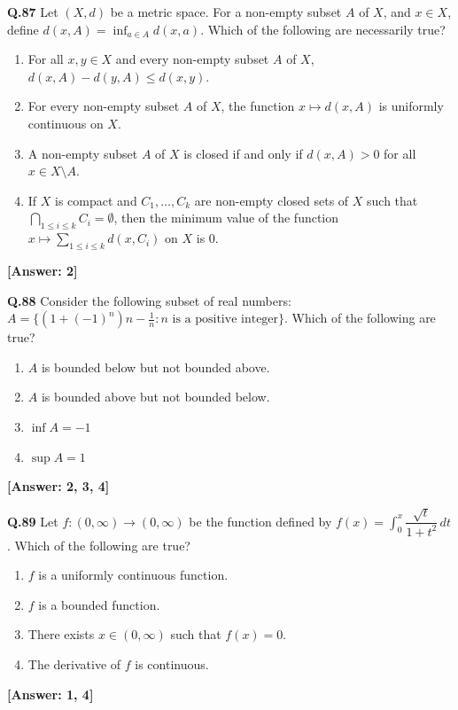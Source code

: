 \documentclass[12pt,a4paper]{article}
\newcommand{\ans}[1]{\quad\textcolor{anscolor}{\textbf{[Answer: #1]}}}
\begin{document}
\textbf{Q.87} Let $(X,d)$ be a metric space. For a non-empty subset $A$ of $X$, and $x\in X$, define $d(x,A)=\inf_{a\in A}d(x,a)$. Which of the following are necessarily true?
\begin{enumerate}[label=\arabic*.]
\item For all $x,y\in X$ and every non-empty subset $A$ of $X$, $d(x,A)-d(y,A)\le d(x,y)$.
\item For every non-empty subset $A$ of $X$, the function $x\mapsto d(x,A)$ is uniformly continuous on $X$.
\item A non-empty subset $A$ of $X$ is closed if and only if $d(x,A)>0$ for all $x\in X\setminus A$.
\item If $X$ is compact and $C_1,\ldots,C_k$ are non-empty closed sets of $X$ such that $\bigcap_{1\le i\le k}C_i=\emptyset$, then the minimum value of the function $x\mapsto\sum_{1\le i\le k}d(x,C_i)$ on $X$ is 0.
\end{enumerate}\ans{2}

\textbf{Q.88} Consider the following subset of real numbers: $A=\bigl\{(1+(-1)^n)n-\tfrac{1}{n}:n\text{ is a positive integer}\bigr\}$. Which of the following are true?
\begin{enumerate}[label=\arabic*.]
\item $A$ is bounded below but not bounded above.
\item $A$ is bounded above but not bounded below.
\item $\inf A=-1$ \item $\sup A=1$
\end{enumerate}\ans{2, 3, 4}

\textbf{Q.89} Let $f:(0,\infty)\to(0,\infty)$ be the function defined by $f(x)=\int_0^x\dfrac{\sqrt{t}}{1+t^2}\,dt$. Which of the following are true?
\begin{enumerate}[label=\arabic*.]
\item $f$ is a uniformly continuous function. \item $f$ is a bounded function.
\item There exists $x\in(0,\infty)$ such that $f(x)=0$. \item The derivative of $f$ is continuous.
\end{enumerate}\ans{1, 4}
\end{document}
